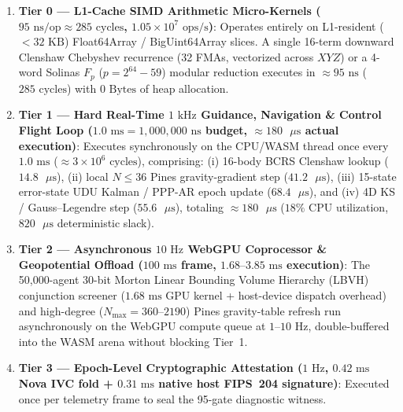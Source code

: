 \documentclass[11pt,a4paper,reqno]{article}
\def\texttt#1{#1}%
\def\mathbb#1{#1}%
\theoremstyle{plain}
\theoremstyle{definition}
\theoremstyle{remark}
\numberwithin{equation}{section}
\begin{document}
\begin{enumerate}[leftmargin=1.8em,itemsep=2pt]
  \item \textbf{Tier 0 --- L1-Cache SIMD Arithmetic Micro-Kernels ($95\text{ ns/op} \approx 285\text{ cycles}$, $1.05 \times 10^7\text{ ops/s}$)}: Operates entirely on L1-resident ($< 32\text{ KB}$) \texttt{Float64Array} / \texttt{BigUint64Array} slices. A single 16-term downward Clenshaw Chebyshev recurrence (32 FMAs, vectorized across $XYZ$) or a 4-word Solinas $\mathbb{F}_p$ ($p = 2^{64}-59$) modular reduction executes in $\approx 95\text{ ns}$ ($285\text{ cycles}$) with $0\text{ Bytes}$ of heap allocation.
  \item \textbf{Tier 1 --- Hard Real-Time $1\text{ kHz}$ Guidance, Navigation \& Control Flight Loop ($1.0\text{ ms} = 1,000,000\text{ ns}$ budget, $\approx 180\text{ }\mu\text{s}$ actual execution)}: Executes synchronously on the CPU/WASM thread once every $1.0\text{ ms}$ ($\approx 3 \times 10^6\text{ cycles}$), comprising: (i) 16-body BCRS Clenshaw lookup ($14.8\text{ }\mu\text{s}$), (ii) local $N \le 36$ Pines gravity-gradient step ($41.2\text{ }\mu\text{s}$), (iii) 15-state error-state UDU Kalman / PPP-AR epoch update ($68.4\text{ }\mu\text{s}$), and (iv) 4D KS / Gauss--Legendre step ($55.6\text{ }\mu\text{s}$), totaling $\approx 180\text{ }\mu\text{s}$ ($18\%$ CPU utilization, $820\text{ }\mu\text{s}$ deterministic slack).
  \item \textbf{Tier 2 --- Asynchronous $10\text{ Hz}$ WebGPU Coprocessor \& Geopotential Offload ($100\text{ ms}$ frame, $1.68\text{--}3.85\text{ ms}$ execution)}: The 50,000-agent 30-bit Morton Linear Bounding Volume Hierarchy (LBVH) conjunction screener ($1.68\text{ ms}$ GPU kernel + host-device dispatch overhead) and high-degree ($N_{\max}=360\text{--}2190$) Pines gravity-table refresh run asynchronously on the WebGPU compute queue at $1\text{--}10\text{ Hz}$, double-buffered into the WASM arena without blocking Tier~1.
  \item \textbf{Tier 3 --- Epoch-Level Cryptographic Attestation ($1\text{ Hz}$, $0.42\text{ ms}$ Nova IVC fold + $0.31\text{ ms}$ native host FIPS~204 signature)}: Executed once per telemetry frame to seal the 95-gate diagnostic witness.
\end{enumerate}
\end{document}
